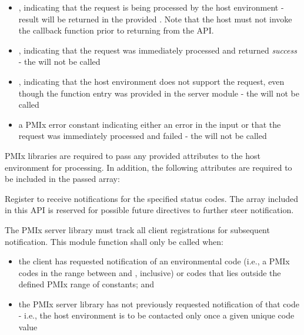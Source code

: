 \begin{itemize}
    \item {}, indicating that the request is being processed by the host environment - result will be returned in the provided . Note that the host must not invoke the callback function prior to returning from the \ac{API}.
    \item {}, indicating that the request was immediately processed and returned \textit{success} - the  will not be called
    \item {}, indicating that the host environment does not support the request, even though the function entry was provided in the server module - the  will not be called
    \item a PMIx error constant indicating either an error in the input or that the request was immediately processed and failed - the  will not be called
\end{itemize}

\reqattrstart
\ac{PMIx} libraries are required to pass any provided attributes to the host environment for processing. In addition, the following attributes are required to be included in the passed  array:


\reqattrend

\descr

Register to receive notifications for the specified status codes. The  array included in this API is reserved for possible future directives to further steer notification.

\adviceimplstart
The \ac{PMIx} server library must track all client registrations for subsequent notification. This module function shall only be called when:

\begin{itemize}
    \item the client has requested notification of an environmental code (i.e., a \ac{PMIx} codes in the range between  and , inclusive) or codes that lies outside the defined \ac{PMIx} range of constants; and
    \item the \ac{PMIx} server library has not previously requested notification of that code - i.e., the host environment is to be contacted only once a given unique code value
\end{itemize}

